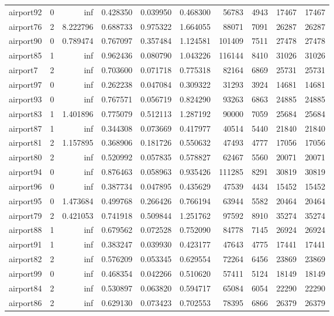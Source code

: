 \begin{longtable}{|l|r|r|r|r|r|r|r|r|r|}
airport92 & 0 & inf & 0.428350 & 0.039950 & 0.468300 & 56783 & 4943 & 17467 & 17467 \\
airport76 & 2 & 8.222796 & 0.688733 & 0.975322 & 1.664055 & 88071 & 7091 & 26287 & 26287 \\
airport90 & 0 & 0.789474 & 0.767097 & 0.357484 & 1.124581 & 101409 & 7511 & 27478 & 27478 \\
airport85 & 1 & inf & 0.962436 & 0.080790 & 1.043226 & 116144 & 8410 & 31026 & 31026 \\
airport7 & 2 & inf & 0.703600 & 0.071718 & 0.775318 & 82164 & 6869 & 25731 & 25731 \\
airport97 & 0 & inf & 0.262238 & 0.047084 & 0.309322 & 31293 & 3924 & 14681 & 14681 \\
airport93 & 0 & inf & 0.767571 & 0.056719 & 0.824290 & 93263 & 6863 & 24885 & 24885 \\
airport83 & 1 & 1.401896 & 0.775079 & 0.512113 & 1.287192 & 90000 & 7059 & 25684 & 25684 \\
airport87 & 1 & inf & 0.344308 & 0.073669 & 0.417977 & 40514 & 5440 & 21840 & 21840 \\
airport81 & 2 & 1.157895 & 0.368906 & 0.181726 & 0.550632 & 47493 & 4777 & 17056 & 17056 \\
airport80 & 2 & inf & 0.520992 & 0.057835 & 0.578827 & 62467 & 5560 & 20071 & 20071 \\
airport94 & 0 & inf & 0.876463 & 0.058963 & 0.935426 & 111285 & 8291 & 30819 & 30819 \\
airport96 & 0 & inf & 0.387734 & 0.047895 & 0.435629 & 47539 & 4434 & 15452 & 15452 \\
airport95 & 0 & 1.473684 & 0.499768 & 0.266426 & 0.766194 & 63944 & 5582 & 20464 & 20464 \\
airport79 & 2 & 0.421053 & 0.741918 & 0.509844 & 1.251762 & 97592 & 8910 & 35274 & 35274 \\
airport88 & 1 & inf & 0.679562 & 0.072528 & 0.752090 & 84778 & 7145 & 26924 & 26924 \\
airport91 & 1 & inf & 0.383247 & 0.039930 & 0.423177 & 47643 & 4775 & 17441 & 17441 \\
airport82 & 2 & inf & 0.576209 & 0.053345 & 0.629554 & 72264 & 6456 & 23869 & 23869 \\
airport99 & 0 & inf & 0.468354 & 0.042266 & 0.510620 & 57411 & 5124 & 18149 & 18149 \\
airport84 & 2 & inf & 0.530897 & 0.063820 & 0.594717 & 65084 & 6054 & 22290 & 22290 \\
airport86 & 2 & inf & 0.629130 & 0.073423 & 0.702553 & 78395 & 6866 & 26379 & 26379 \\

\end{longtable}
